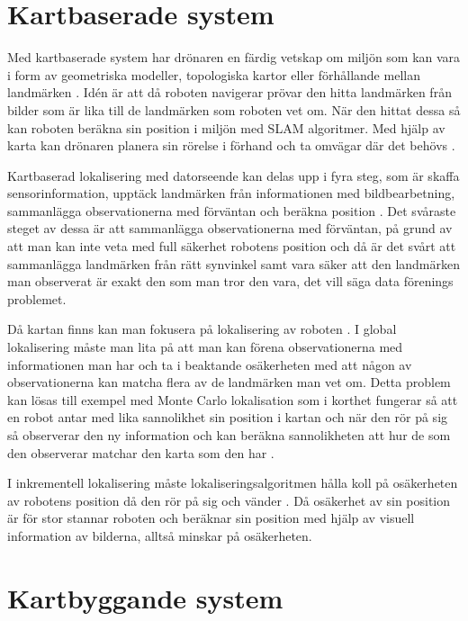\section{Kartbaserade system}

Med kartbaserade system har drönaren en färdig vetskap om miljön som kan vara i form av geometriska modeller, topologiska kartor eller förhållande mellan landmärken \citep{982903}. Idén är att då roboten navigerar prövar den hitta landmärken från bilder som är lika till de landmärken som roboten vet om. När den hittat dessa så kan roboten beräkna sin position i miljön med SLAM algoritmer. Med hjälp av karta kan drönaren planera sin rörelse i förhand och ta omvägar där det behövs \citep{geospatial}. 

Kartbaserad lokalisering med datorseende kan delas upp i fyra steg, som är skaffa sensorinformation, upptäck landmärken från informationen med bildbearbetning, sammanlägga observationerna med förväntan och beräkna position \citep{982903}. Det svåraste steget av dessa är att sammanlägga observationerna med förväntan, på grund av att man kan inte veta med full säkerhet robotens position och då är det svårt att sammanlägga landmärken från rätt synvinkel samt vara säker att den landmärken man observerat är exakt den som man tror den vara, det vill säga data förenings problemet.

Då kartan finns kan man fokusera på lokalisering av roboten \citep{982903}. I global lokalisering måste man lita på att man kan förena observationerna med informationen man har och ta i beaktande osäkerheten med att någon av observationerna kan matcha flera av de landmärken man vet om. Detta problem kan lösas till exempel med Monte Carlo lokalisation som i korthet fungerar så att en robot antar med lika sannolikhet sin position i kartan och när den rör på sig så observerar den ny information och kan beräkna sannolikheten att hur de som den observerar matchar den karta som den har \citep{772544}.

I inkrementell lokalisering måste lokaliseringsalgoritmen hålla koll på osäkerheten av robotens position då den rör på sig och vänder \citep{772544}. Då osäkerhet av sin position är för stor stannar roboten och beräknar sin position med hjälp av visuell information av bilderna, alltså minskar på osäkerheten.

\section{Kartbyggande system}

